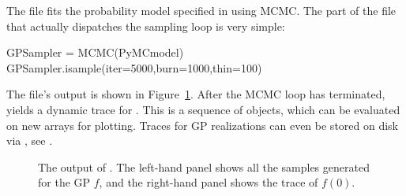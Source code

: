 \documentclass[article]{jss}
\begin{document}
The file  fits the probability model specified in  using MCMC. The part of the file that actually dispatches the sampling loop is very simple:
\begin{CodeChunk}
\begin{CodeInput}
GPSampler = MCMC(PyMCmodel)
GPSampler.isample(iter=5000,burn=1000,thin=100)    
\end{CodeInput}
\end{CodeChunk}
The file's output is shown in Figure~\ref{fig:MCMCOutput}. After the MCMC loop has terminated, \\ yields a dynamic trace for . This is a sequence of  objects, which can be evaluated on new arrays for plotting. Traces for GP realizations can even be stored on disk via  \citep{tables}, see \cite{pymc}.


\begin{figure}
    \centering
    \caption{The output of . The left-hand panel shows all the samples generated for the GP $f$, and the right-hand panel shows the trace of $f(0)$.}
    \label{fig:MCMCOutput}
\end{figure}
 
\end{document}
